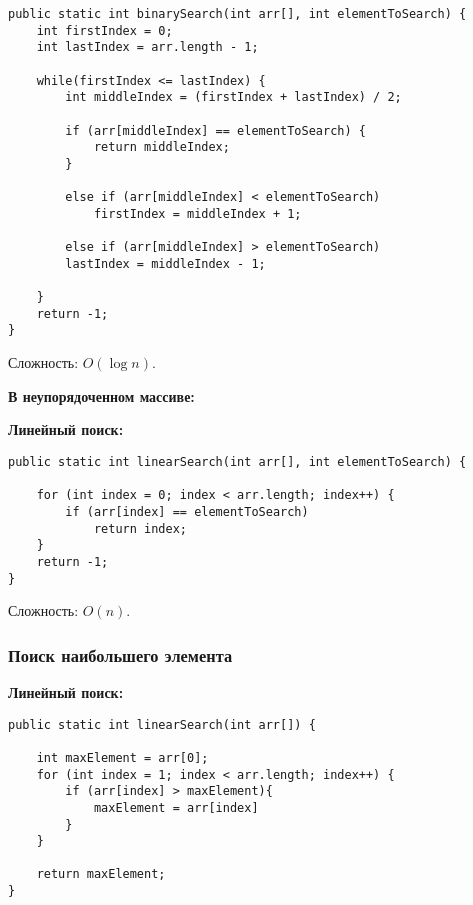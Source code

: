 \documentclass[12pt]{matmex-diploma}
\begin{document}
                \begin{verbatim}
public static int binarySearch(int arr[], int elementToSearch) {
    int firstIndex = 0;
    int lastIndex = arr.length - 1;

    while(firstIndex <= lastIndex) {
        int middleIndex = (firstIndex + lastIndex) / 2;
       
        if (arr[middleIndex] == elementToSearch) {
            return middleIndex;
        }

        else if (arr[middleIndex] < elementToSearch)
            firstIndex = middleIndex + 1;

        else if (arr[middleIndex] > elementToSearch)
        lastIndex = middleIndex - 1;
        
    }
    return -1;
}
                \end{verbatim}
                
                Сложность: $O(\log{n})$.
                
        
            \textbf{В неупорядоченном массиве:}
                
                \textbf{Линейный поиск:}
                
                    \begin{verbatim}
public static int linearSearch(int arr[], int elementToSearch) {

    for (int index = 0; index < arr.length; index++) {
        if (arr[index] == elementToSearch)
            return index;
    }
    return -1;
}
                    \end{verbatim}
                    
                    Сложность: $O(n)$.
            
        \subsubsection*{Поиск наибольшего элемента}
        
            \textbf{Линейный поиск:}
                
                    \begin{verbatim}
public static int linearSearch(int arr[]) {

    int maxElement = arr[0];
    for (int index = 1; index < arr.length; index++) {
        if (arr[index] > maxElement){
            maxElement = arr[index]
        }
    }
    
    return maxElement;
}   
                    \end{verbatim}
                    
\end{document}
